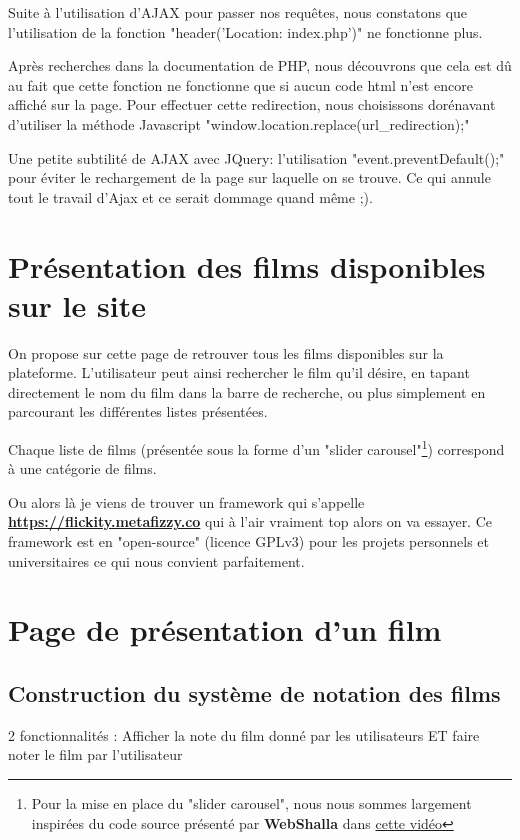 \documentclass[a4paper, 11pt]{MyReport}
\begin{document}
			\begin{rmq}
				Suite à l'utilisation d'AJAX pour passer nos requêtes, nous constatons que l'utilisation de la fonction "header('Location: index.php')" ne fonctionne plus. 

				Après recherches dans la documentation de PHP, nous découvrons que cela est dû au fait que cette fonction ne fonctionne que si aucun code html n'est encore affiché sur la page. Pour effectuer cette redirection, nous choisissons dorénavant d'utiliser la méthode Javascript "window.location.replace(url\_redirection);"  
			\end{rmq}

			\begin{rmq}
				Une petite subtilité de AJAX avec JQuery: l'utilisation "event.preventDefault();" pour éviter le rechargement de la page sur laquelle on se trouve.  Ce qui annule tout le travail d'Ajax et ce serait dommage quand même ;).
			\end{rmq}

		\section{Présentation des films disponibles sur le site}

			On propose sur cette page de retrouver tous les films disponibles sur la plateforme. L'utilisateur peut ainsi rechercher le film qu'il désire, en tapant directement le nom du film dans la barre de recherche, ou plus simplement en parcourant les différentes listes présentées.

			Chaque liste de films (présentée sous la forme d'un "slider carousel"\footnote{Pour la mise en place du "slider carousel", nous nous sommes largement inspirées du code source présenté par {\bfseries WebShalla} dans \href{https://www.youtube.com/watch?v=Gi4CTYOs7J4}{cette vidéo} }) correspond à une catégorie de films.

			Ou alors là je viens de trouver un framework qui s'appelle {\bfseries \href{Flickity}{https://flickity.metafizzy.co} } qui à l'air vraiment top alors on va essayer. Ce framework est en "open-source" (licence GPLv3) pour les projets personnels et universitaires ce qui nous convient parfaitement.


		\section{Page de présentation d'un film}

			\subsection{Construction du système de notation des films}
				2 fonctionnalités : Afficher la note du film donné par les utilisateurs ET faire noter le film par l'utilisateur
\end{document}
